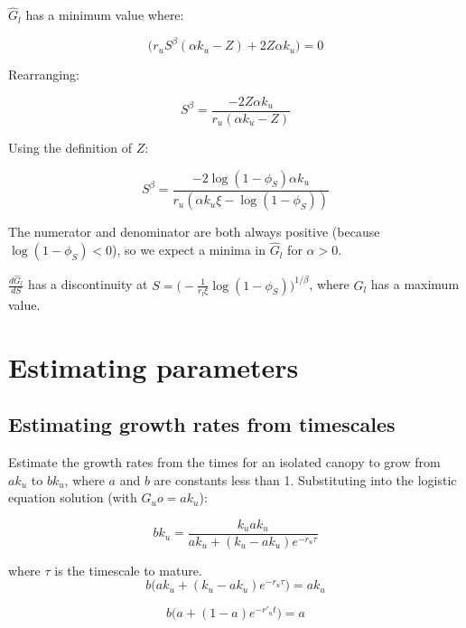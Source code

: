 \documentclass{article}
\begin{document}
     $ \hat{G}_l$  has a minimum value where:
    
      \begin{equation}
      \big( {r_u} S^{\beta }(\alpha  {k_u}  - Z) +2 Z \alpha  {k_u} \big) = 0
    \end{equation}
    
    Rearranging:
    
      \begin{equation}
     S^{\beta } = \frac{-2 Z \alpha  {k_u} }{{r_u}(\alpha  {k_u}  - Z)  }
    \end{equation}
    
    Using the definition of $Z$:
    
      \begin{equation}
     S^{\beta } = \frac{-2 {\log({1-\phi_S})} \alpha  {k_u} }{{r_u}(\alpha  {k_u} \xi - {\log({1-\phi_S})})  }
    \end{equation}
    
    The numerator and denominator are both always positive (because $\log(1-\phi_S) < 0$), so we expect a minima in $\hat G_l$ for $\alpha > 0$.
    
     $\frac{d \hat{G}_l}{dS}$ has a discontinuity at  $ S = \big( - \frac{1}{r_l \xi }\log (1 - \phi_S)\big)^{1/\beta}$, where $G_l$ has a maximum value.
    


\section{Estimating parameters}
\subsection{Estimating growth rates from timescales}

Estimate the growth rates from the times for an isolated canopy to grow from $a k_u$ to $b k_u$, where $a$ and $b$ are constants less than 1.
Substituting into the logistic equation solution (with $ G_uo = a k_u$):

\begin{equation}
    b k_u = \frac{k_u  a k_u }{ a k_u +(k_u- a k_u) e^{-r_u \tau}}
\end{equation}

where $\tau$ is the timescale to mature.
\begin{equation}
    b ({ a k_u +(k_u- a k_u) e^{-r_u \tau}) ={ a k_u }}
\end{equation}

\begin{equation}
    b ({ a  +(1- a ) e^{-r'_u t}) ={ a  }}
\end{equation}
\end{document}
